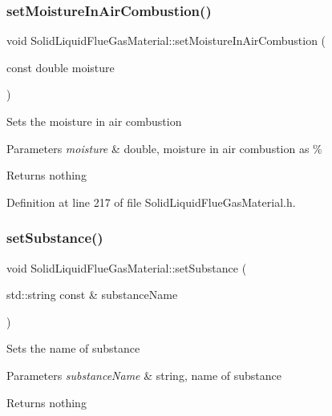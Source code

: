\subsubsection{\texorpdfstring{set\+Moisture\+In\+Air\+Combustion()}{setMoistureInAirCombustion()}\hspace{0.1cm}{\footnotesize\ttfamily [3/3]}}
{\footnotesize\ttfamily void Solid\+Liquid\+Flue\+Gas\+Material\+::set\+Moisture\+In\+Air\+Combustion (\begin{DoxyParamCaption}\item[{const double}]{moisture }\end{DoxyParamCaption})\hspace{0.3cm}{\ttfamily [inline]}}

Sets the moisture in air combustion 
\begin{DoxyParams}{Parameters}
{\em moisture} & double, moisture in air combustion as \% \\
\hline
\end{DoxyParams}
\begin{DoxyReturn}{Returns}
nothing 
\end{DoxyReturn}


Definition at line 217 of file Solid\+Liquid\+Flue\+Gas\+Material.\+h.

\mbox{\label{class_solid_liquid_flue_gas_material_a54be915432c1300c4d8eaf7bf2be361f}} 
\subsubsection{\texorpdfstring{set\+Substance()}{setSubstance()}\hspace{0.1cm}{\footnotesize\ttfamily [1/3]}}
{\footnotesize\ttfamily void Solid\+Liquid\+Flue\+Gas\+Material\+::set\+Substance (\begin{DoxyParamCaption}\item[{std\+::string const \&}]{substance\+Name }\end{DoxyParamCaption})\hspace{0.3cm}{\ttfamily [inline]}}

Sets the name of substance 
\begin{DoxyParams}{Parameters}
{\em substance\+Name} & string, name of substance \\
\hline
\end{DoxyParams}
\begin{DoxyReturn}{Returns}
nothing 
\end{DoxyReturn}


